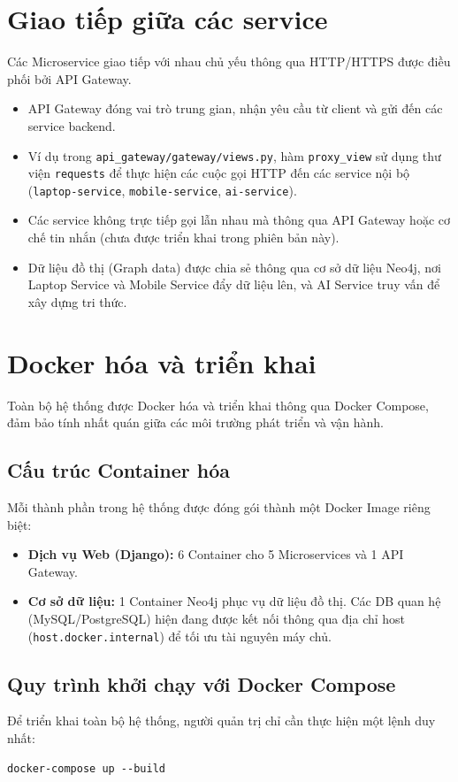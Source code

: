 \documentclass[12pt,a4paper]{report}
\begin{document}
\section{Giao tiếp giữa các service}
Các Microservice giao tiếp với nhau chủ yếu thông qua HTTP/HTTPS được điều phối bởi API Gateway.
\begin{itemize}
    \item API Gateway đóng vai trò trung gian, nhận yêu cầu từ client và gửi đến các service backend.
    \item Ví dụ trong \texttt{api\_gateway/gateway/views.py}, hàm \texttt{proxy\_view} sử dụng thư viện \texttt{requests} để thực hiện các cuộc gọi HTTP đến các service nội bộ (\texttt{laptop-service}, \texttt{mobile-service}, \texttt{ai-service}).
    \item Các service không trực tiếp gọi lẫn nhau mà thông qua API Gateway hoặc cơ chế tin nhắn (chưa được triển khai trong phiên bản này).
    \item Dữ liệu đồ thị (Graph data) được chia sẻ thông qua cơ sở dữ liệu Neo4j, nơi Laptop Service và Mobile Service đẩy dữ liệu lên, và AI Service truy vấn để xây dựng tri thức.
\end{itemize}

\section{Docker hóa và triển khai}
Toàn bộ hệ thống được Docker hóa và triển khai thông qua Docker Compose, đảm bảo tính nhất quán giữa các môi trường phát triển và vận hành.

\subsection{Cấu trúc Container hóa}
Mỗi thành phần trong hệ thống được đóng gói thành một Docker Image riêng biệt:
\begin{itemize}
    \item \textbf{Dịch vụ Web (Django):} 6 Container cho 5 Microservices và 1 API Gateway.
    \item \textbf{Cơ sở dữ liệu:} 1 Container Neo4j phục vụ dữ liệu đồ thị. Các DB quan hệ (MySQL/PostgreSQL) hiện đang được kết nối thông qua địa chỉ host (\texttt{host.docker.internal}) để tối ưu tài nguyên máy chủ.
\end{itemize}

\subsection{Quy trình khởi chạy với Docker Compose}
Để triển khai toàn bộ hệ thống, người quản trị chỉ cần thực hiện một lệnh duy nhất:
\begin{verbatim}
docker-compose up --build
\end{verbatim}
\end{document}
